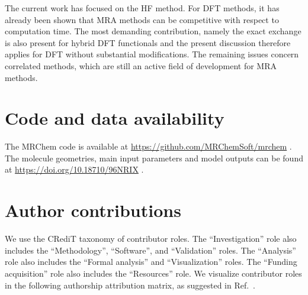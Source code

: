 \documentclass[journal=jctcce, manuscript=article]{achemso}
\begin{document}
The current work has focused on the \ac{HF} method. For \ac{DFT}
methods, it has already been shown that
\ac{MRA} methods can be competitive with respect to computation
time.\cite{Bischoff2019-mr} The most demanding contribution, namely the exact exchange is
also present for hybrid \ac{DFT} functionals and the present
discussion therefore applies for \ac{DFT} without
substantial modifications. The remaining issues concern
correlated methods, which are still an active field of development for
\ac{MRA} methods.\cite{Bischoff2013, Kottmann2017, Kottmann2020}

\section{Code and data availability}
The MRChem code is available at \url{https://github.com/MRChemSoft/mrchem} \cite{mrchem}. The molecule geometries, main input parameters and model outputs can be found at \url{https://doi.org/10.18710/96NRIX} \cite{96NRIX_2022}.

\section{Author contributions}
\label{author_contrib}

We use the CRediT taxonomy of contributor roles.\cite{Allen:2014kj,Brand:2015jr}
The ``Investigation'' role also includes the ``Methodology'', ``Software'', and ``Validation'' roles.
The ``Analysis'' role also includes the ``Formal analysis'' and ``Visualization''
roles. The ``Funding acquisition'' role also includes the ``Resources'' role.
We visualize contributor roles in the following authorship attribution matrix, as suggested in Ref.~.
\end{document}
